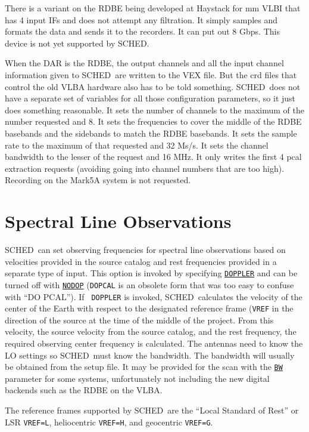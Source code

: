 \documentclass{report}
\newcommand{\schedb}{{\sc SCHED~}}
\begin{document}
There is a variant on the RDBE being developed at Haystack for mm VLBI
that has 4 input IFs and does not attempt any filtration.  It simply
samples and formats the data and sends it to the recorders.  It can
put out 8 Gbps.  This device is not yet supported by SCHED.

When the DAR is the RDBE, the output channels and all the input
channel information given to \schedb are written to the VEX file.  But
the crd files that control the old VLBA hardware also has to be told
something. \schedb does not have a separate set of variables for all
those configuration parameters, so it just does something reasonable.
It sets the number of channels to the maximum of the number requested
and 8.  It sets the frequencies to cover the middle of the RDBE
basebands and the sidebands to match the RDBE basebands.  It sets the
sample rate to the maximum of that requested and 32 Ms/s.  It sets the
channel bandwidth to the lesser of the request and 16 MHz.  It only
writes the first 4 pcal extraction requests (avoiding going into
channel numbers that are too high).  Recording on the Mark5A system
is not requested.


\section{\label{SEC:LINE}Spectral Line Observations}

\schedb can set observing frequencies for spectral line observations
based on velocities provided in the source catalog and rest
frequencies provided in a separate type of input. This option is
invoked by specifying 
{\hyperref[MP:DOPPLER]{{\tt DOPPLER}}} and can be
turned off with 
{\hyperref[MP:DOPPLER]{{\tt NODOP}}} ({\tt DOPCAL} is an
obsolete form that was too easy to confuse with ``DO PCAL'').  If {\tt
DOPPLER} is invoked, \schedb calculates the velocity of the center of
the Earth with respect to the designated reference frame ({\tt VREF}
in the direction of the source at the time of the middle of the
project. From this velocity, the source velocity from the source
catalog, and the rest frequency, the required observing center
frequency is calculated.  The antennas need to know the LO settings so
\schedb must know the bandwidth.  The bandwidth will usually be
obtained from the setup file.  It may be provided for the scan with
the 
{\hyperref[MP:BW]{{\tt BW}}} parameter for some systems, unfortunately
not including the new digital backends such as the RDBE on the VLBA.

The reference frames supported by \schedb are the ``Local Standard
of Rest'' or LSR {\tt VREF=L}, heliocentric {\tt VREF=H}, and
geocentric {\tt VREF=G}.
\end{document}
